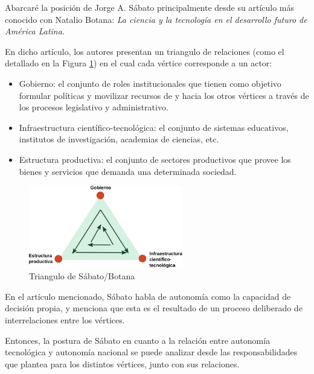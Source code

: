 Abarcaré la posición de Jorge A. Sábato principalmente desde su artículo más conocido con Natalio Botana: \textit{La ciencia y
la tecnología en el desarrollo futuro de América Latina}.

En dicho artículo, los autores presentan un triangulo de relaciones (como el detallado en la Figura \ref{triangulo}) en el cual cada vértice
corresponde a un actor:
\begin{itemize}
    \item Gobierno: el conjunto de roles institucionales que tienen como objetivo formular políticas y movilizar recursos de y hacia los otros vértices a través de los procesos legislativo y administrativo.
    \item Infraestructura científico-tecnológica: el conjunto de sistemas educativos, institutos de investigación, academias de ciencias, etc.
    \item Estructura productiva: el conjunto de sectores productivos que provee los bienes y servicios que demanda una determinada sociedad.
\end{itemize}

\begin{figure}[H]
    \centering
    \includegraphics[width=0.6\textwidth]{imagenes/sabato.png}
    \caption{Triangulo de Sábato/Botana}\label{triangulo}
\end{figure}


En el artículo mencionado, Sábato habla de autonomía como la capacidad de decisión propia, y menciona que esta es el resultado de un proceso deliberado de interrelaciones entre los vértices.

Entonces, la postura de Sábato en cuanto a la relación entre autonomía tecnológica y
autonomía nacional se puede analizar desde las responsabilidades que plantea para los distintos vértices, junto con sus relaciones.

